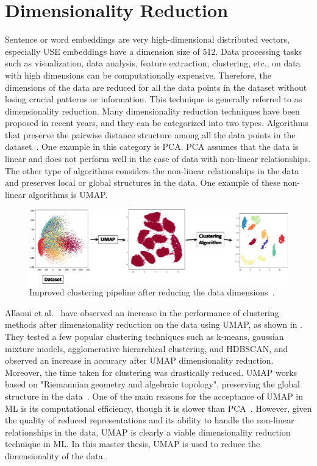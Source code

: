\section{Dimensionality Reduction}

Sentence or word embeddings are very high-dimensional distributed vectors, especially \ac{USE} embeddings have a dimension size of 512. Data processing tasks such as visualization, data analysis, feature extraction, clustering, etc., on data with high dimensions can be computationally expensive. Therefore, the dimensions of the data are reduced for all the data points in the dataset without losing crucial patterns or information. This technique is generally referred to as dimensionality reduction. Many dimensionality reduction techniques have been proposed in recent years, and they can be categorized into two types. Algorithms that preserve the pairwise distance structure among all the data points in the dataset~\cite{mcinnes2018umap}. One example in this category is \ac{PCA}. \ac{PCA} assumes that the data is linear and does not perform well in the case of data with non-linear relationships. The other type of algorithms considers the non-linear relationships in the data and preserves local or global structures in the data. One example of these non-linear algorithms is \ac{UMAP}.


\begin{figure}[h]
	\centering
	\includegraphics[width=.9\textwidth]{images/papers/umap.png}
	\caption[UMAP pipeline for clustering.]{Improved clustering pipeline after reducing the data dimensions~\cite{allaoui2020considerably}.  \label{fig:umap}}
\end{figure}

Allaoui et al.~\cite{allaoui2020considerably} have observed an increase in the performance of clustering methods after dimensionality reduction on the data using \ac{UMAP}, as shown in . They tested a few popular clustering techniques such as k-means, gaussian mixture models, agglomerative hierarchical clustering, and \ac{HDBSCAN}, and observed an increase in accuracy after \ac{UMAP} dimensionality reduction. Moreover, the time taken for clustering was drastically reduced. \ac{UMAP} works based on "Riemannian geometry and algebraic topology", preserving the global structure in the data~\cite{mcinnes2018umap}. One of the main reasons for the acceptance of \ac{UMAP} in \ac{ML} is its computational efficiency, though it is slower than \ac{PCA}~\cite{umaplearnPerformanceComparison}. However, given the quality of reduced representations and its ability to handle the non-linear relationships in the data, \ac{UMAP} is clearly a viable dimensionality reduction technique in \ac{ML}. In this master thesis, \ac{UMAP} is used to reduce the dimensionality of the data.



